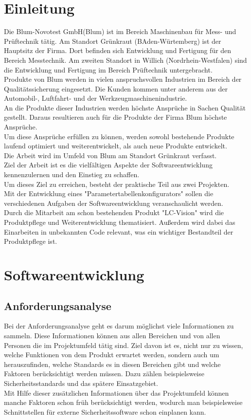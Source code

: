 \documentclass[a4paper,12pt,top=2.5cm,bottom=2.5cm, left=2.5cm, right=2.5cm, numbers=noenddot]{scrartcl}
\begin{document}
\section{Einleitung}
Die Blum-Novotest GmbH(Blum) ist im Bereich Maschinenbau für Mess- und Prüftechnik tätig. Am Standort Grünkraut (BAden-Würtemberg) ist der Hauptsitz der Firma. Dort befinden sich Entwicklung und Fertigung für den Bereich Messtechnik. Am zweiten Standort in Willich (Nordrhein-Westfalen) sind die Entwicklung und Fertigung im Bereich Prüftechnik untergebracht.\\
Produkte von Blum werden in vielen anspruchsvollen Industrien im Bereich der Qualitätssicherung eingesetzt. Die Kunden kommen unter anderem aus der Automobil-, Luftfahrt- und der Werkzeugmaschinenindustrie. \\
An die Produkte dieser Industrien werden höchste Ansprüche in Sachen Qualität gestellt. Daraus resultieren auch für die Produkte der Firma Blum höchste Ansprüche. \\
Um diese Ansprüche erfüllen zu können, werden sowohl bestehende Produkte laufend optimiert und weiterentwickelt, als auch neue Produkte entwickelt. \\
Die Arbeit wird im Umfeld von Blum am Standort Grünkraut verfasst. \\
Ziel der Arbeit ist es die vielfältigen Aspekte der Softwareentwicklung kennenzulernen und den Einstieg zu schaffen.\\
Um dieses Ziel zu erreichen, besteht der praktische Teil aus zwei Projekten.\\
Mit der Entwicklung eines "Parametertabellenkonfigurators" sollen die verschiedenen Aufgaben der Softwareentwicklung veranschaulicht werden.\\
Durch die Mitarbeit am schon bestehenden Produkt "LC-Vision" wird die Produktpflege und Weiterentwicklung thematisiert. 
Außerdem wird dabei das Einarbeiten in unbekannten Code relevant, was ein wichtiger Bestandteil der Produktpflege ist.
\newpage   
\section{Softwareentwicklung}
\subsection{Anforderungsanalyse}
Bei der Anforderungsanalyse geht es darum möglichst viele Informationen zu sammeln. Diese Informationen können aus allen Bereichen und von allen Personen die im Projektumfeld tätig sind. Ziel davon ist es, nicht nur zu wissen, welche Funktionen von dem Produkt erwartet werden, sondern auch um herauszufinden, welche Standards es in diesen Bereichen gibt und welche Faktoren berücksichtigt werden müssen. Dazu zählen beispielsweise Sicherheitsstandards und das spätere Einsatzgebiet. 
\\Mit Hilfe dieser zusätzlichen Informationen über das Projektumfeld können manche Faktoren schon früh berücksichtigt werden, wodurch man beispielsweise Schnittstellen für externe Sicherheitssoftware schon einplanen kann.
\end{document}
